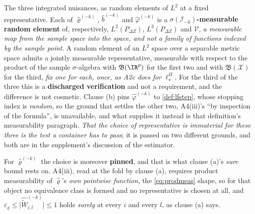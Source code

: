 \begin{definition}
\begin{enumerate}
\begin{enumerate}
The three integrated nuisances, as random elements of $L^{2}$ at a fixed representative. Each of
$\hat\varrho^{(-k)}$, $\hat b^{(-k)}$ and $\hat\varphi^{(-k)}$ is a
\textbf{$\sigma(\mathcal I_{-k})$-measurable random element} of, respectively, $L^{2}(P_{\Delta Z})$,
$L^{2}(P_{\Delta Z})$ and $\mathcal V$, \emph{a measurable map from the sample space into the space, and
not a family of functions indexed by the sample point}. A random element of an $L^{2}$ space over a
separable metric space admits a jointly measurable representative, measurable with respect to the
product of the sample $\sigma$-algebra with $\mathfrak B(\IR^{p})$ for the first two and with
$\mathfrak B(\mathcal X)$ for the third, \emph{fix one for each, once, as A2c does for
$\ell^\Pi_\star$}.
For the third of the three this is a \textbf{discharged verification} and not a requirement, and the
difference is not cosmetic. Clause \textup{(b)} pins $\hat\varphi^{(-k)}$ to \cref{def:lfstep}, whose
stopping index is \emph{random}, so the ground that settles the other two, A4(iii)'s ``by inspection of the
formula'', is unavailable, and what supplies it instead is that definition's measurability paragraph.
\emph{That the choice of representative is immaterial for these three is the test a container has to pass};
it is passed on two different grounds, and both are in the supplement's discussion of the estimator.

For $\hat\varrho^{(-k)}$ the choice is moreover \textbf{pinned}, and that is what clause
\textup{(a)}'s \emph{sure} bound rests on. A4(iii), read at the fold by
clause \textup{(a)}, requires product measurability of $\hat\varrho$'s \emph{own pointwise function}, 
the \eqref{eq:prodmeas} shape, so for that object no equivalence class is formed and
no representative is chosen at all, and
$\varepsilon_\varrho\le\big|\widehat{\widetilde W}^{(-k)}_{i,l}\big|\le1$ holds \emph{surely} at every $i$
and every $l$, as clause \textup{(a)} says.


\end{enumerate}
\end{enumerate}
\end{definition}
